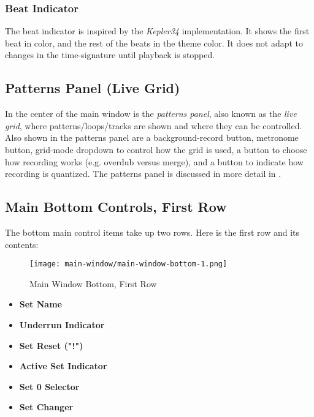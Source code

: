 \subsubsection{Beat Indicator}
\label{subsubsec:introduction_beat_indicator}

   The beat indicator is inspired by the \textsl{Kepler34} implementation.
   It shows the first beat in color, and the rest of the beats in the theme
   color.
   It does not adapt to changes in the time-signature until
   playback is stopped.

\subsection{Patterns Panel (Live Grid)}
\label{subsec:introduction_main_live_grid}

   In the center of the main window is the \textsl{patterns panel}, also 
   known as the \textsl{live grid}, where patterns/loops/tracks are shown
   and where they can be controlled.
   Also shown in the patterns panel are a
   background-record button,
   metronome button, 
   grid-mode dropdown to control how the grid is used,
   a button to choose how recording works (e.g. overdub versus merge), and
   a button to indicate how recording is quantized.
   The patterns panel is discussed in more detail in
   .

\subsection{Main Bottom Controls, First Row}
\label{subsec:introduction_main_bottom_controls}

   The bottom main control items take up two rows.
   Here is the first row and its contents:

\begin{figure}[H]
   \centering 
   \texttt{[image: main-window/main-window-bottom-1.png]}
   \caption{Main Window Bottom, First Row}
   \label{fig:main_window_bottom_1}
\end{figure}

   \begin{itemize}
      \item \textbf{Set Name}
      \item \textbf{Underrun Indicator}
      \item \textbf{Set Reset ("!")}
      \item \textbf{Active Set Indicator}
      \item \textbf{Set 0 Selector}
      \item \textbf{Set Changer}
   \end{itemize}

